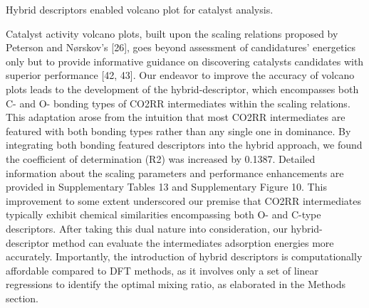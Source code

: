 Hybrid descriptors enabled volcano plot for catalyst analysis.

Catalyst activity volcano plots, built upon the scaling relations proposed by Peterson and Nørskov’s [26], goes beyond assessment of candidatures’ energetics only but to provide informative guidance on discovering catalysts candidates with superior performance [42, 43]. Our endeavor to improve the accuracy of volcano plots leads to the development of the hybrid-descriptor, which encompasses both C- and O- bonding types of CO2RR intermediates within the scaling relations. This adaptation arose from the intuition that most CO2RR intermediates are featured with both bonding types rather than any single one in dominance. By integrating both bonding featured descriptors into the hybrid approach, we found the coefficient of determination (R2) was increased by 0.1387. Detailed information about the scaling parameters and performance enhancements are provided in Supplementary Tables 13 and Supplementary Figure 10. This improvement to some extent underscored our premise that CO2RR intermediates typically exhibit chemical similarities encompassing both O- and C-type descriptors. After taking this dual nature into consideration, our hybrid-descriptor method can evaluate the intermediates adsorption energies more accurately. Importantly, the introduction of hybrid descriptors is computationally affordable compared to DFT methods, as it involves only a set of linear regressions to identify the optimal mixing ratio, as elaborated in the Methods section.

